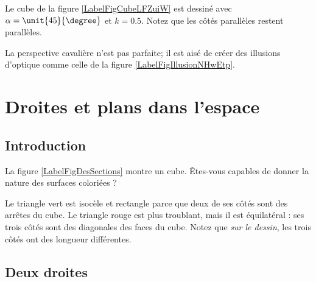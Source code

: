 Le cube de la figure \ref{LabelFigCubeLFZuiW} est dessiné avec \( \alpha=\unit{45}{\degree}\) et \( k=0.5\). Notez que les côtés parallèles restent parallèles.
\newcommand{\CaptionFigCubeLFZuiW}{Les segments perpendiculaires à la feuille sont de longueur moitié des autres.}


La perspective cavalière n'est pas parfaite; il est aisé de créer des illusions d'optique comme celle de la figure \ref{LabelFigIllusionNHwEtp}. %
\newcommand{\CaptionFigIllusionNHwEtp}{Une petite illusion d'optique facile.}


\section{Droites et plans dans l'espace}

\subsection{Introduction}

La figure \ref{LabelFigDesSections} montre un cube. Êtes-vous capables de donner la nature des surfaces coloriées ?
\newcommand{\CaptionFigDesSections}{Exercice de vision dans l'espace.}

Le triangle vert est isocèle et rectangle parce que deux de ses côtés sont des arrêtes du cube. Le triangle rouge est plus troublant, mais il est équilatéral : ses trois côtés sont des diagonales des faces du cube. Notez que \emph{sur le dessin}, les trois côtés ont des longueur différentes.


\subsection{Deux droites}

